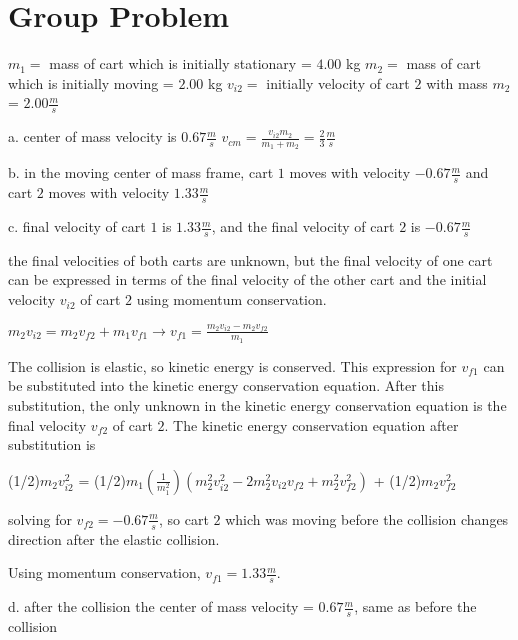 \chapter{Group Problem}
\label{Group Problem}
$m_{1} = $ mass of cart which is initially stationary = $4.00$ kg
$m_{2} = $ mass of cart which is initially moving = $2.00$ kg
$v_{i2} = $ initially velocity of cart $2$ with mass $m_{2}$ = $2.00 \frac{m}{s}$


a. center of mass velocity is $0.67 \frac{m}{s}$
$v_{cm} = \frac{v_{i2}m_{2}}{m_{1} + m_{2}} = \frac{2}{3} \frac{m}{s}$

b. in the moving center of mass frame, cart $1$ moves with velocity $-0.67 \frac{m}{s}$
and cart $2$ moves with velocity $1.33 \frac{m}{s}$

c. final velocity of cart $1$ is $1.33 \frac{m}{s}$, and the final velocity
of cart $2$ is $-0.67 \frac{m}{s}$

the final velocities of both carts are unknown, but the final velocity of one cart
can be expressed in terms of the final velocity of the other cart and the initial
velocity $v_{i2}$ of cart $2$ using momentum conservation.

$m_{2}v_{i2} = m_{2}v_{f2} + m_{1}v_{f1} \rightarrow v_{f1} = \frac{m_{2}v_{i2} - m_{2}v_{f2}}{m_{1}}$

The collision is elastic, so kinetic energy is conserved.  This expression for $v_{f1}$
can be substituted into the kinetic energy conservation equation.  After this substitution,
the only unknown in the kinetic energy conservation equation is the final velocity $v_{f2}$
of cart $2$.  The kinetic energy conservation equation after substitution is

(1/2)$m_{2}v_{i2}^{2}$ = (1/2)$m_{1}(\frac{1}{m_{1}^{2}})(m_{2}^{2}v_{i2}^{2} - 2m_{2}^{2}v_{i2}v_{f2} + m_{2}^{2}v_{f2}^{2})$ + (1/2)$m_{2}v_{f2}^{2}$

solving for $v_{f2} = -0.67 \frac{m}{s}$, so cart $2$ which was moving before the collision
changes direction after the elastic collision.

Using momentum conservation, $v_{f1} = 1.33 \frac{m}{s}$.


d. after the collision the center of mass velocity = $0.67 \frac{m}{s}$, same as before the collision

